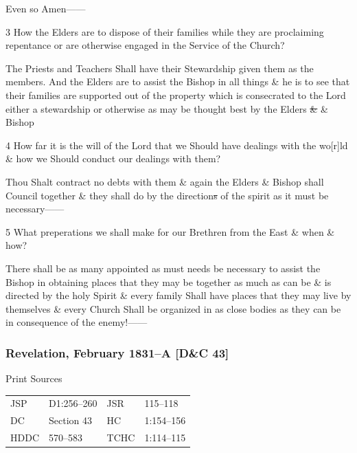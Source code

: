 				\begin{tightright}
				Even so Amen------
				\end{tightright}
				
				3 How the Elders are to dispose of their families while they are proclaiming repentance or are otherwise engaged in the Service of the Church?
				
				The Priests and Teachers Shall have their Stewardship given them as the members. And the Elders are to assist the Bishop in all things \& he is to see that their families are supported out of the property which is consecrated to the Lord either a stewardship or otherwise as may be thought best by the Elders \sout{\&} \& Bishop
				
				4 How far it is the will of the Lord that we Should have dealings with the wo[r]ld \& how we Should conduct our dealings with them?
				
				Thou Shalt contract no debts with them \& again the Elders \& Bishop shall Council together \& they shall do by the direction\sout{s} of the spirit as it must be necessary------
				
				5 What preperations we shall make for our Brethren from the East \& when \& how?
				
				There shall be as many appointed as must needs be necessary to assist the Bishop in obtaining places that they may be together as much as can be \& is directed by the holy Spirit \& every family Shall have places that they may live by themselves \& every Church Shall be organized in as close bodies as they can be in consequence of the enemy!------
				
		\subsubsection{Revelation, February 1831--A [D\&C 43]}
			\label{EMS-1831-JS-FEB-1831-A}
		
			\begin{description}
				\item[Print Sources]
			\end{description}

				\begin{tabular}{p{0.5in}p{1in}p{0.5in}p{1in}}
				JSP	 	& D1:256--260	& JSR 		& 115--118 \\
				DC	 	& Section 43 	& HC 		& 1:154--156 \\
				HDDC 	& 570--583		& TCHC 		& 1:114--115 \\
				\end{tabular}
			

